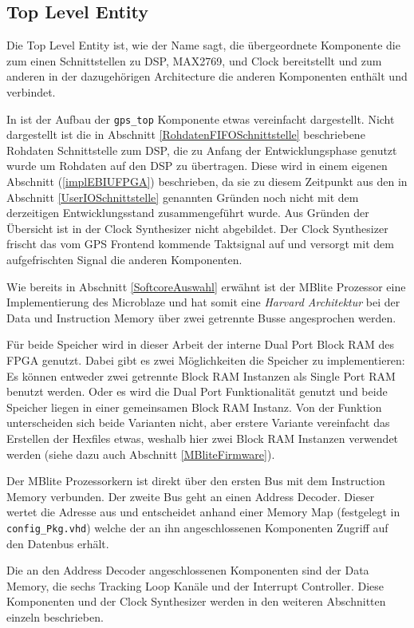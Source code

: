 \subsection{Top Level Entity}\label{Section_gps_top_entity}
Die Top Level Entity ist, wie der Name sagt, die übergeordnete Komponente die zum einen Schnittstellen zu DSP, MAX2769, und Clock bereitstellt und zum anderen in der dazugehörigen Architecture die anderen Komponenten enthält und verbindet.

In  ist der Aufbau der \lstinline$gps_top$ Komponente etwas vereinfacht dargestellt. Nicht dargestellt ist die in Abschnitt \ref{RohdatenFIFOSchnittstelle} beschriebene Rohdaten Schnittstelle zum DSP, die zu Anfang der Entwicklungsphase genutzt wurde um Rohdaten auf den DSP zu übertragen. Diese wird in einem eigenen Abschnitt (\ref{implEBIUFPGA}) beschrieben, da sie zu diesem Zeitpunkt aus den in Abschnitt \ref{UserIOSchnittstelle} genannten Gründen noch nicht mit dem derzeitigen Entwicklungsstand zusammengeführt wurde. Aus Gründen der Übersicht ist in  der Clock Synthesizer nicht abgebildet. Der Clock Synthesizer frischt das vom GPS Frontend kommende Taktsignal auf und versorgt mit dem aufgefrischten Signal die anderen Komponenten.


Wie bereits in Abschnitt \ref{SoftcoreAuswahl} erwähnt ist der  MBlite Prozessor eine Implementierung des Microblaze und hat somit eine \emph{Harvard Architektur} bei der Data und Instruction Memory über zwei getrennte Busse angesprochen werden.

Für beide Speicher wird in dieser Arbeit der interne Dual Port Block RAM des FPGA genutzt. Dabei gibt es zwei Möglichkeiten die Speicher zu implementieren: Es können entweder zwei getrennte Block RAM Instanzen als Single Port RAM benutzt werden. Oder es wird die Dual Port Funktionalität genutzt und beide Speicher liegen in  einer gemeinsamen Block RAM Instanz. Von der Funktion unterscheiden sich beide Varianten nicht, aber erstere Variante vereinfacht das Erstellen der Hexfiles etwas, weshalb hier zwei Block RAM Instanzen verwendet werden (siehe dazu auch Abschnitt \ref{MBliteFirmware}).

Der MBlite Prozessorkern ist direkt über den ersten Bus mit dem Instruction Memory verbunden. Der zweite Bus geht an einen Address Decoder. Dieser wertet die Adresse aus und entscheidet anhand einer Memory Map (festgelegt in \lstinline$config_Pkg.vhd$) welche der an ihn angeschlossenen Komponenten Zugriff auf den Datenbus erhält.

Die an den Address Decoder angeschlossenen Komponenten sind der Data Memory, die sechs Tracking Loop Kanäle und der Interrupt Controller. Diese Komponenten und der Clock Synthesizer werden in den weiteren Abschnitten einzeln beschrieben.
